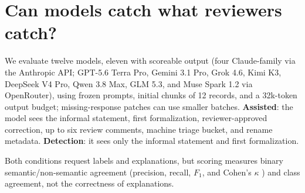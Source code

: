 \documentclass{article}
\begin{document}
\begin{table}[t]\centering\footnotesize

\caption{Error classes over the 74 natural negatives (multi-label). Wrong
carriers, definitional mismatches, and missing hypotheses dominate: errors of
\emph{semantics}, not syntax. Bold labels identify the Lean-semantics group
(Section~\ref{sec:eval}).}
\label{tab:classes}
\end{table}

\section{Can models catch what reviewers catch?}
\label{sec:eval}
We evaluate twelve models, eleven with scoreable output (four Claude-family
via the Anthropic API; GPT-5.6 Terra Pro, Gemini 3.1 Pro, Grok 4.6, Kimi K3,
DeepSeek V4 Pro, Qwen 3.8 Max, GLM 5.3, and Muse Spark 1.2 via OpenRouter),
using frozen prompts, initial chunks of 12 records,
and a 32k-token output budget; missing-response patches can use smaller batches. \textbf{Assisted}: the model sees the informal
statement, first formalization, reviewer-approved correction, up to six review comments, machine triage
bucket, and rename metadata. \textbf{Detection}: it sees only the informal statement and first
formalization.

Both conditions request labels and explanations, but scoring
measures binary semantic/non-semantic agreement (precision, recall, $F_1$,
and Cohen's $\kappa$ \citep{cohen1960kappa}) and class agreement, not the
correctness of explanations.

\begin{table}[t]\centering\small
{}
\caption{Agreement with the final reference on each condition's scoreable
records. Columns $n$ give answered counts; $\dagger$ marks models with
incomplete coverage in either condition. Bold marks the best value in each
column among complete-coverage models, ties included. Muse Spark 1.2 produced
no scoreable output within the output budget. Missing outputs are not counted
as correct or incorrect.}
\label{tab:main}
\end{table}
\end{document}
